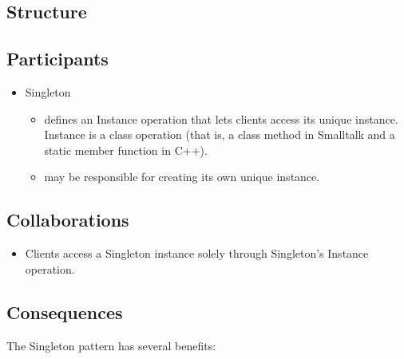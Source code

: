 \subsection*{Structure}

\subsection*{Participants}

\begin{itemize}
    \item Singleton
    \begin{itemize}
        \item defines an Instance operation that lets clients access its unique instance. Instance is a class operation (that is, a class method in Smalltalk and a static member function in C++).
        \item may be responsible for creating its own unique instance.
    \end{itemize}
\end{itemize}

\subsection*{Collaborations}

\begin{itemize}
    \item Clients access a Singleton instance solely through Singleton's Instance operation.
\end{itemize}

\subsection*{Consequences}

The Singleton pattern has several benefits:

